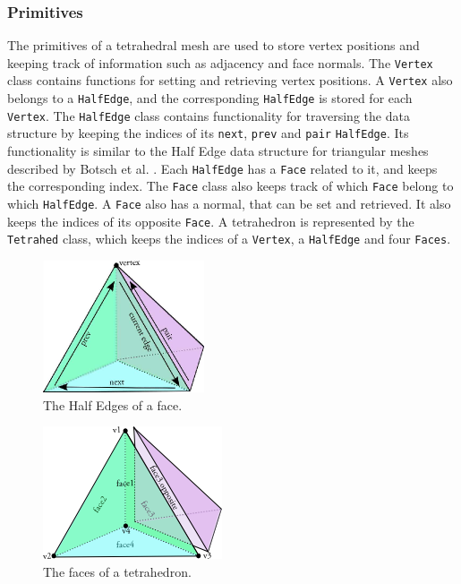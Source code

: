 \documentclass[10pt,a4paper]{article}
\begin{document}
\subsubsection{Primitives}
The primitives of a tetrahedral mesh are used to store vertex positions and keeping track of information such as adjacency and face normals. The \texttt{Vertex} class contains functions for setting and retrieving vertex positions. A \texttt{Vertex} also belongs to a \texttt{HalfEdge}, and the corresponding \texttt{HalfEdge} is stored for each \texttt{Vertex}. The \texttt{HalfEdge} class contains functionality for traversing the data structure by keeping the indices of its \texttt{next}, \texttt{prev} and \texttt{pair} \texttt{HalfEdge}. Its functionality is similar to the Half Edge data structure for triangular meshes described by Botsch et al. \cite{Botsch}. Each \texttt{HalfEdge} has a \texttt{Face} related to it, and keeps the corresponding index. The \texttt{Face} class also keeps track of which \texttt{Face} belong to which \texttt{HalfEdge}. A \texttt{Face} also has a normal, that can be set and retrieved. It also keeps the indices of its opposite \texttt{Face}. A tetrahedron is represented by the \texttt{Tetrahed} class, which keeps the indices of a \texttt{Vertex}, a \texttt{HalfEdge} and four \texttt{Faces}.


\begin{figure}[htbp]
\label{fig:tetraedge}
\begin{center}
\includegraphics[scale=1]{figures/tetra_edge}
\caption{The Half Edges of a face.}
\end{center}
\end{figure}

\begin{figure}[htbp]
\label{fig:tetraface}
\begin{center}
\includegraphics[scale=1]{figures/tetra_face}
\caption{The faces of a tetrahedron.}
\end{center}
\end{figure}
\end{document}
